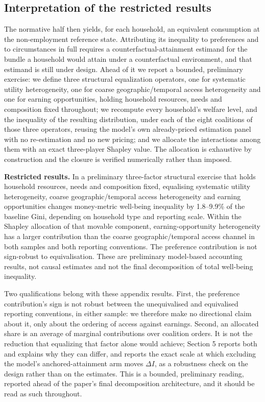 \documentclass[11pt,a4paper]{article}
\begin{document}
\subsection{Interpretation of the restricted results}\label{interpretation-of-the-restricted-results}

The normative half then yields, for each household, an equivalent consumption at the non-employment reference state. Attributing its inequality to preferences and to circumstances in full requires a counterfactual-attainment estimand for the bundle a household would attain under a counterfactual environment, and that estimand is still under design. Ahead of it we report a bounded, preliminary exercise: we define three structural equalization operators, one for systematic utility heterogeneity, one for coarse geographic/temporal access heterogeneity and one for earning opportunities, holding household resources, needs and composition fixed throughout; we recompute every household's welfare level, and the inequality of the resulting distribution, under each of the eight coalitions of those three operators, reusing the model's own already-priced estimation panel with no re-estimation and no new pricing; and we allocate the interactions among them with an exact three-player Shapley value. The allocation is exhaustive by construction and the closure is verified numerically rather than imposed.

\textbf{Restricted results.} In a preliminary three-factor structural exercise that holds household resources, needs and composition fixed, equalising systematic utility heterogeneity, coarse geographic/temporal access heterogeneity and earning opportunities changes money-metric well-being inequality by 1.8--9.9\% of the baseline Gini, depending on household type and reporting scale. Within the Shapley allocation of that movable component, earning-opportunity heterogeneity has a larger contribution than the coarse geographic/temporal access channel in both samples and both reporting conventions. The preference contribution is not sign-robust to equivalisation. These are preliminary model-based accounting results, not causal estimates and not the final decomposition of total well-being inequality.

Two qualifications belong with these appendix results. First, the preference contribution's sign is not robust between the unequivalised and equivalised reporting conventions, in either sample: we therefore make no directional claim about it, only about the ordering of access against earnings. Second, an allocated share is an average of marginal contributions over coalition orders. It is not the reduction that equalizing that factor alone would achieve; Section 5 reports both and explains why they can differ, and reports the exact scale at which excluding the model's anchored-attainment arm moves \(\Delta I\), as a robustness check on the design rather than on the estimates. This is a bounded, preliminary reading, reported ahead of the paper's final decomposition architecture, and it should be read as such throughout.
\end{document}
